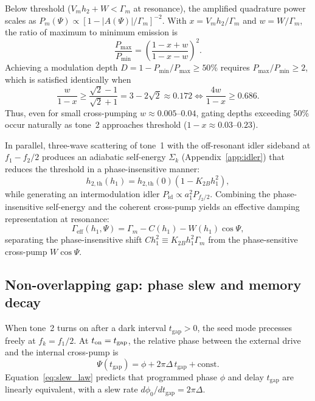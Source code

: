 \documentclass[aps,prb,reprint,superscriptaddress,floatfix]{revtex4-2}
\newcommand{\tgap}{t_{\mathrm{gap}}}
\begin{document}
Below threshold ($V_m h_2 + W < \Gamma_m$ at resonance), the amplified quadrature power scales as $P_m(\Psi)\propto [1-|A(\Psi)|/\Gamma_m]^{-2}$. With $x=V_m h_2/\Gamma_m$ and $w=W/\Gamma_m$, the ratio of maximum to minimum emission is
\begin{equation}
\frac{P_{\max}}{P_{\min}} = \left(\frac{1-x+w}{1-x-w}\right)^2.
\label{eq:depth_ratio}
\end{equation}
Achieving a modulation depth $D=1-P_{\min}/P_{\max}\ge 50\%$ requires $P_{\max}/P_{\min}\ge 2$, which is satisfied identically when
\begin{equation}
\frac{w}{1-x} \ge \frac{\sqrt{2}-1}{\sqrt{2}+1} = 3-2\sqrt{2}\approx 0.172 \iff \frac{4w}{1-x}\ge 0.686.
\label{eq:depth_criterion}
\end{equation}
Thus, even for small cross-pumping $w\approx 0.005\text{--}0.04$, gating depths exceeding 50\% occur naturally as tone~2 approaches threshold ($1-x\approx 0.03\text{--}0.23$).

In parallel, three-wave scattering of tone~1 with the off-resonant idler sideband at $f_1-f_2/2$ produces an adiabatic self-energy $\Sigma_k$ (Appendix~\ref{app:idler}) that reduces the threshold in a phase-insensitive manner:
\begin{equation}
h_{2,\mathrm{th}}(h_1) = h_{2,\mathrm{th}}(0)\left(1 - K_{2B}h_1^2\right),
\label{eq:k2b_shift}
\end{equation}
while generating an intermodulation idler $P_{\mathrm{id}}\propto a_1^2 P_{f_2/2}$. Combining the phase-insensitive self-energy and the coherent cross-pump yields an effective damping representation at resonance:
\begin{equation}
\Gamma_{\mathrm{eff}}(h_1,\Psi) = \Gamma_m - C(h_1) - W(h_1)\cos\Psi,
\label{eq:gamma_eff}
\end{equation}
separating the phase-insensitive shift $C h_1^2 \equiv K_{2B}h_1^2 \Gamma_m$ from the phase-sensitive cross-pump $W\cos\Psi$.

\subsection{Non-overlapping gap: phase slew and memory decay}\label{sec:th_memory}

When tone~2 turns on after a dark interval $\tgap>0$, the seed mode precesses freely at $f_k=f_1/2$. At $t_{\rm on}=\tgap$, the relative phase between the external drive and the internal cross-pump is
\begin{equation}
\Psi(\tgap) = \phi + 2\pi\Delta\,\tgap + \text{const}.
\label{eq:slew_law}
\end{equation}
Equation~\eqref{eq:slew_law} predicts that programmed phase $\phi$ and delay $\tgap$ are linearly equivalent, with a slew rate $d\phi_0/d\tgap = 2\pi\Delta$.
\end{document}
